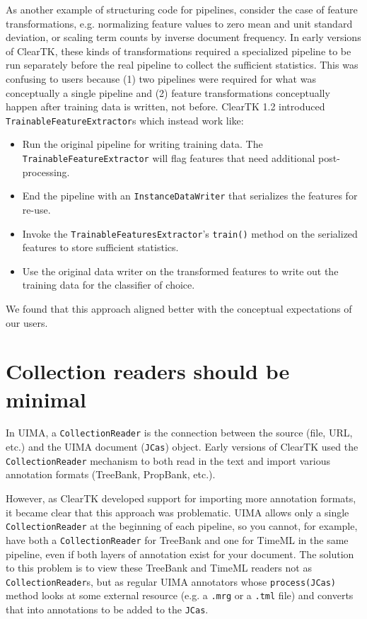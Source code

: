 \documentclass[10pt, a4paper]{article}
\newcommand{\code}[1]{\texttt{\small #1}}
\begin{document}
As another example of structuring code for pipelines, consider the case of feature transformations, e.g. normalizing feature values to zero mean and unit standard deviation, or scaling term counts by inverse document frequency.
In early versions of ClearTK, these kinds of transformations required a specialized pipeline to be run separately before the real pipeline to collect the sufficient statistics.
This was confusing to users because (1) two pipelines were required for what was conceptually a single pipeline and (2) feature transformations conceptually happen after training data is written, not before.
ClearTK 1.2 introduced \code{TrainableFeatureExtractor}s which instead work like:
\begin{itemize}
\item Run the original pipeline for writing training data. The \code{TrainableFeatureExtractor} will flag features that need additional post-processing.
\item End the pipeline with an \code{InstanceDataWriter} that serializes the features for re-use.
\item Invoke the \code{TrainableFeaturesExtractor}'s \code{train()} method on the serialized features to store sufficient statistics.
\item Use the original data writer on the transformed features to write out the training data for the classifier of choice.
\end{itemize}
We found that this approach aligned better with the conceptual expectations of our users.


\section{Collection readers should be minimal}
In UIMA, a \code{CollectionReader} is the connection between the source (file, URL, etc.) and the UIMA document (\code{JCas}) object.
Early versions of ClearTK used the \code{CollectionReader} mechanism to both read in the text and import various annotation formats (TreeBank, PropBank, etc.).

However, as ClearTK developed support for importing more annotation formats, it became clear that this approach was problematic.
UIMA allows only a single \code{CollectionReader} at the beginning of each pipeline, so you cannot, for example, have both a \code{CollectionReader} for TreeBank and one for TimeML in the same pipeline, even if both layers of annotation exist for your document.
The solution to this problem is to view these TreeBank and TimeML readers not as \code{CollectionReader}s, but as regular UIMA annotators whose \code{process(JCas)} method looks at some external resource (e.g. a \code{.mrg} or a \code{.tml} file) and converts that into annotations to be added to the \code{JCas}.
\end{document}
